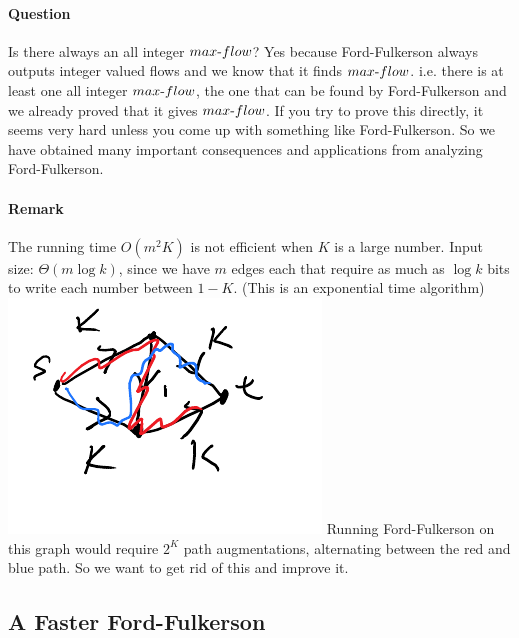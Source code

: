 \documentclass[12 pt]{article}
\begin{document}
        \paragraph{Question} Is there always an all integer
        $max\hbox{-}flow$? Yes because Ford-Fulkerson always outputs integer
        valued flows and we know that it finds $max\hbox{-}flow$. i.e. there
        is at least one all integer $max\hbox{-}flow$, the one that can be
        found by Ford-Fulkerson and we already proved that it gives
        $max\hbox{-}flow$. If you try to prove this directly, it seems very
        hard unless you come up with something like Ford-Fulkerson. So
        we have obtained many important consequences and applications
        from analyzing Ford-Fulkerson.
        \paragraph{Remark} The running time $O(m^2K)$ is not efficient
        when $K$ is a large number. Input size: $\Theta(m \log k)$,
        since we have $m$ edges each that require as much as $\log k$
        bits to write each number between $1-K$. (This is an
        exponential time algorithm)
        \\ \includegraphics[width=.9\textwidth]{i37.pdf} Running
        Ford-Fulkerson on this graph would require $2^K$ path
        augmentations, alternating between the red and blue path. So
        we want to get rid of this and improve it.
        \subsection{A Faster Ford-Fulkerson}
\end{document}
